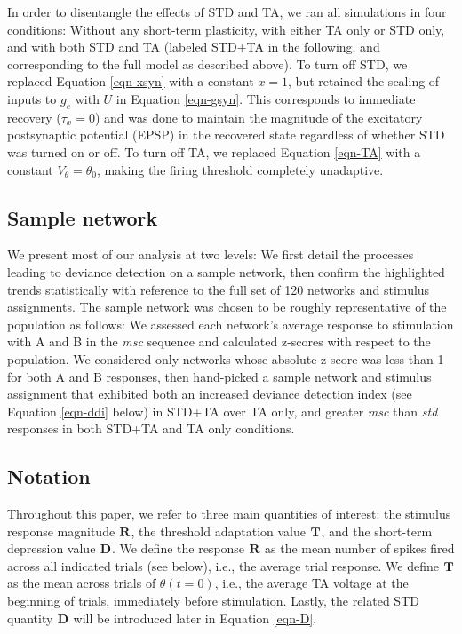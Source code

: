 \documentclass[pdflatex,referee,iicol,sn-basic]{sn-jnl}
\newcommand{\msc}{\textit{msc}}
\newcommand{\std}{\textit{std}}
\renewcommand{\R}[3][]{{}^{#1}_{}\mathbf{R}^{#2}_{#3}}
\renewcommand{\T}[3][]{{}^{#1}_{}\mathbf{T}^{#2}_{#3}}
\newcommand{\D}[3][]{{}^{#1}_{}\mathbf{D}^{#2}_{#3}}
\begin{document}
In order to disentangle the effects of STD and TA, we ran all simulations in four conditions: Without any short-term plasticity, with either TA only or STD only, and with both STD and TA (labeled STD+TA in the following, and corresponding to the full model as described above). To turn off STD, we replaced Equation \ref{eqn-xsyn} with a constant $x = 1$, but retained the scaling of inputs to $g_e$ with $U$ in Equation \ref{eqn-gsyn}. This corresponds to immediate recovery ($\tau_x = 0$) and was done to maintain the magnitude of the excitatory postsynaptic potential (EPSP) in the recovered state regardless of whether STD was turned on or off. To turn off TA, we replaced Equation \ref{eqn-TA} with a constant $V_{\theta} = \theta_0$, making the firing threshold completely unadaptive.

\subsection{Sample network}\label{sec-sample}

We present most of our analysis at two levels: We first detail the processes leading to deviance detection on a sample network, then confirm the highlighted trends statistically with reference to the full set of 120 networks and stimulus assignments. The sample network was chosen to be roughly representative of the population as follows: We assessed each network's average response to stimulation with A and B in the \msc{} sequence and calculated z-scores with respect to the population. We considered only networks whose absolute z-score was less than 1 for both A and B responses, then hand-picked a sample network and stimulus assignment that exhibited both an increased deviance detection index (see Equation \ref{eqn-ddi} below) in STD+TA over TA only, and greater \msc{} than \std{} responses in both STD+TA and TA only conditions.

\subsection{Notation}\label{sec-notation}

Throughout this paper, we refer to three main quantities of interest: the stimulus response magnitude $\R{}{}$, the threshold adaptation value $\T{}{}$, and the short-term depression value $\D{}{}$. We define the response $\R{}{}$ as the mean number of spikes fired across all indicated trials (see below), i.e., the average trial response. We define $\T{}{}$ as the mean across trials of $\theta(t=0)$, i.e., the average TA voltage at the beginning of trials, immediately before stimulation. Lastly, the related STD quantity $\D{}{}$ will be introduced later in Equation \ref{eqn-D}.
\end{document}

